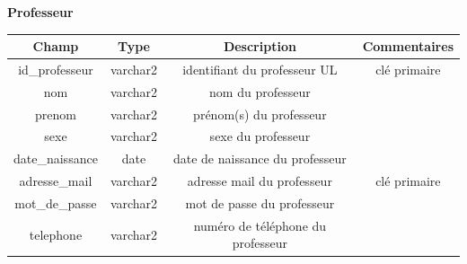 \documentclass{scrreprt}
\begin{document}
\begin{center}
\vspace {3cm}
\textbf 
{Professeur}
\vspace {0,5cm}

\begin{tabular}{|c|c|c|c|}
  \hline
  \textbf {Champ} & \textbf {Type} & \textbf {Description} & \textbf {Commentaires} \\
  \hline
  id_professeur & varchar2 & identifiant du professeur UL & clé primaire\\
  \hline
  nom & varchar2 & nom du professeur & \\
  \hline
  prenom & varchar2 & prénom(s) du professeur &  \\
  \hline
  sexe & varchar2 & sexe du professeur &  \\
  \hline
  date_naissance & date & date de naissance du professeur &  \\
  \hline
  adresse_mail & varchar2 & adresse mail du professeur & clé primaire  \\
  \hline
  mot_de_passe & varchar2 & mot de passe du professeur &  \\
  \hline
  telephone & varchar2 & numéro de téléphone du professeur &  \\
  \hline
\end{tabular}

\end{center}
\end{document}
